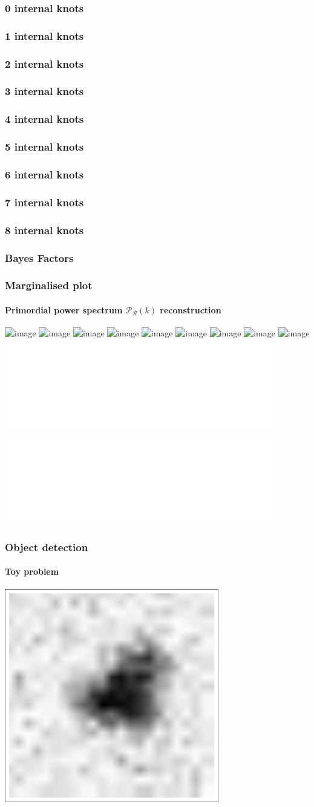 \documentclass[]{beamer}
\newcommand{\PR}{\mathcal{P}_\mathcal{R}}
\begin{document}
\begin{frame}
  \frametitle<1>{0 internal knots}
  \frametitle<2>{1 internal knots}
  \frametitle<3>{2 internal knots}
  \frametitle<4>{3 internal knots}
  \frametitle<5>{4 internal knots}
  \frametitle<6>{5 internal knots}
  \frametitle<7>{6 internal knots}
  \frametitle<8>{7 internal knots}
  \frametitle<9>{8 internal knots}
  \frametitle<10>{Bayes Factors}
  \frametitle<11>{Marginalised plot}
  \framesubtitle{Primordial power spectrum $\PR(k)$ reconstruction}


  \begin{center}
    \includegraphics<1>[width=0.9\textwidth]{figures/0TT_fgivenx}
    \includegraphics<2>[width=0.9\textwidth]{figures/1TT_fgivenx}
    \includegraphics<3>[width=0.9\textwidth]{figures/2TT_fgivenx}
    \includegraphics<4>[width=0.9\textwidth]{figures/3TT_fgivenx}
    \includegraphics<5>[width=0.9\textwidth]{figures/4TT_fgivenx}
    \includegraphics<6>[width=0.9\textwidth]{figures/5TT_fgivenx}
    \includegraphics<7>[width=0.9\textwidth]{figures/6TT_fgivenx}
    \includegraphics<8>[width=0.9\textwidth]{figures/7TT_fgivenx}
    \includegraphics<9>[width=0.9\textwidth]{figures/8TT_fgivenx}
    \includegraphics<10>[width=0.9\textwidth]{figures/Bayes_TT.pdf}
    \includegraphics<11>[width=0.9\textwidth]{figures/combined_fgivenx.pdf}

  \end{center}
\end{frame}

\begin{frame}
  \frametitle{Object detection}
  \framesubtitle{Toy problem}

  \centerline{%
  \includegraphics[width=0.7\textwidth]{figures/object_detection_image}
}

\end{frame}
\end{document}
